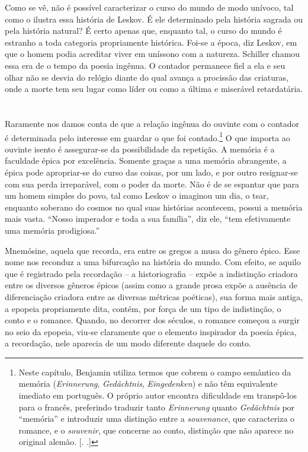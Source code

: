 Como se vê, não é possível caracterizar o curso do mundo de modo
unívoco, tal como o ilustra essa história de Leskov. É ele determinado
pela história sagrada ou pela história natural? É certo apenas que,
enquanto tal, o curso do mundo é estranho a toda categoria propriamente
histórica. Foi-se a época, diz Leskov, em que o homem podia acreditar
viver em uníssono com a natureza. Schiller chamou essa era de o tempo da
poesia ingênua. O contador permanece fiel a ela e seu olhar não se
desvia do relógio diante do qual avança a procissão das criaturas, onde
a morte tem seu lugar como líder ou como a última e miserável retardatária.

\section{}

Raramente nos damos conta de que a relação ingênua do ouvinte com o
contador é determinada pelo interesse em guardar o que foi contado.\footnote{Neste capítulo, Benjamin utiliza termos que cobrem o campo
  semântico da memória (\emph{Erinnerung}, \emph{Gedächtnis},
  \emph{Eingedenken}) e não têm equivalente imediato em português. O
  próprio autor encontra dificuldade em transpô-los para o francês,
  preferindo traduzir tanto \emph{Erinnerung} quanto \emph{Gedächtnis}
  por ``memória'' e introduzir uma distinção entre a \emph{souvenance},
  que caracteriza o romance, e o \emph{souvenir}, que concerne ao conto,
  distinção que não aparece no original alemão. [. .]} O
que importa ao ouvinte isento é assegurar-se da possibilidade da
repetição. A memória é a faculdade épica por excelência. Somente graças
a uma memória abrangente, a épica pode apropriar-se do curso das coisas,
por um lado, e por outro resignar-se com sua perda irreparável, com o
poder da morte. Não é de se espantar que para um homem simples do povo,
tal como Leskov o imaginou um dia, o tsar, enquanto soberano do cosmos
no qual suas histórias acontecem, possui a memória mais vasta. ``Nosso
imperador e toda a sua família'', diz ele, ``tem efetivamente uma memória
prodigiosa.''

Mnemósine, aquela que recorda, era entre os gregos a musa do gênero
épico. Esse nome nos reconduz a uma bifurcação na história do mundo. Com
efeito, se aquilo que é registrado pela recordação -- a historiografia
-- expõe a indistinção criadora entre os diversos gêneros épicos (assim
como a grande prosa expõe a ausência de diferenciação criadora entre as
diversas métricas poéticas), sua forma mais antiga, a epopeia
propriamente dita, contém, por força de um tipo de indistinção, o conto
e o romance. Quando, no decorrer dos séculos, o romance começou a surgir
no seio da epopeia, viu-se claramente que o elemento inspirador da
poesia épica, a recordação, nele aparecia de um modo diferente daquele
do conto.

